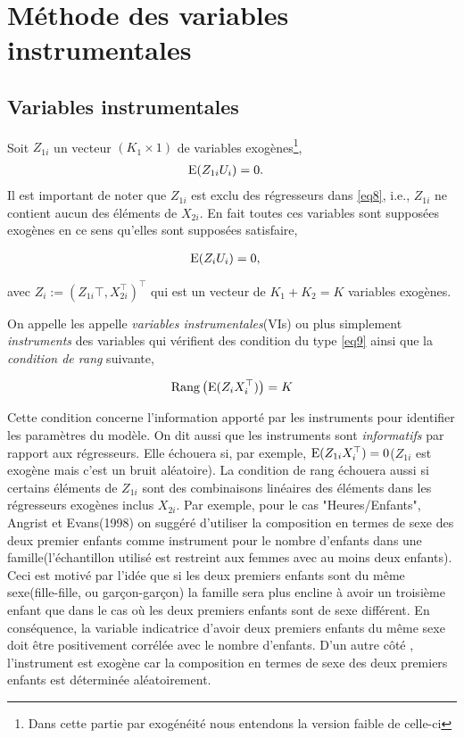 \section{Méthode des variables instrumentales}

\subsection{Variables instrumentales}
Soit $Z_{1i}$ un vecteur $(K_1\times 1)$ de 
variables exogènes\footnote{Dans cette partie par exogénéité nous entendons la version faible de celle-ci},
\begin{align*}
\operatorname{E}(Z_{1i}U_i) &= 0.
\end{align*}
Il est important de noter que  $Z_{1i}$ est exclu des régresseurs dans \eqref{eq8}, i.e., $Z_{1i}$ 
ne contient aucun des éléments de $X_{2i}$. En fait toutes ces variables sont supposées exogènes en ce sens 
qu'elles sont supposées satisfaire, 

\begin{align}
	\operatorname{E}(Z_iU_i) &= 0,
\label{eq9}
\end{align}

avec $Z_i:=(Z_{1i}\top, X_{2i}^\top)^\top$ qui est un vecteur de $K_1 + K_2 = K$ variables exogènes.

On appelle les appelle \emph{variables instrumentales}(VIs) ou plus simplement \emph{instruments}
des variables qui vérifient des condition du type \eqref{eq9} ainsi que la \emph{condition de rang} suivante,

\begin{align}
	\mathrm{Rang}\left(\operatorname{E}(Z_iX_i^\top)\right) = K
	\label{eq10}
\end{align}

Cette condition concerne l'information apporté par les instruments pour identifier les paramètres du modèle. 
On dit aussi que les instruments sont \emph{informatifs} par rapport aux régresseurs. 
Elle échouera si, par exemple, $\operatorname{E}(Z_{1i}X_i^\top) = 0$($Z_{1i}$ est exogène mais c'est un bruit aléatoire). 
La condition de rang échouera aussi si certains éléments de $Z_{1i}$ sont des 
combinaisons linéaires des éléments dans les régresseurs exogènes inclus $X_{2i}$.
Par exemple, pour le cas "Heures/Enfants", Angrist et Evans(1998) on suggéré d'utiliser la composition 
en termes de sexe des deux premier enfants  comme instrument pour le nombre d'enfants dans une 
famille(l'échantillon utilisé est restreint  aux femmes avec au moins deux enfants). 
Ceci est motivé par l'idée que si les deux premiers enfants sont du même sexe(fille-fille, ou garçon-garçon) 
la famille sera plus encline à avoir un troisième enfant que dans le cas où les deux premiers enfants sont 
de sexe différent. En conséquence, la variable indicatrice d'avoir deux premiers enfants du même sexe 
doit être positivement corrélée avec le nombre d'enfants. D'un autre côté , l'instrument est 
exogène car la composition en termes de sexe des deux premiers enfants est déterminée aléatoirement.

